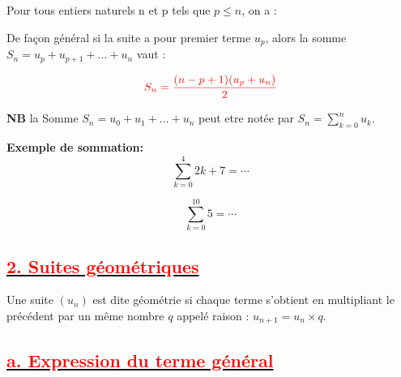 \documentclass{article}
\newcounter{exemple}
\newcommand{\exemple}{%
  \refstepcounter{exemple}%
  \textbf{\textcolor{orange}{Exemple \theexemple : }} \ignorespaces
}
\newcounter{solution}
\newcommand{\solution}{%
  \refstepcounter{solution}%
  \textbf{\textcolor{orange}{Solution \thesolution : }} \ignorespaces
}
\begin{document}
Pour tous entiers naturels n et p tels que $p \leq n$, on a :

%	
%
%

De façon général si la suite a pour premier terme $u_{p}$, alors la somme $S_{n}=u_{p}+u_{p+1}+\ldots+u_{n}$ vaut :

\begin{mdframed}[linecolor=red] %
    \[
    \color{red} S_{n}=\dfrac{(n-p+1)(u_{p}+u_{n})}{2}
    \]
\end{mdframed}

\textbf{NB} la Somme $S_{n}=u_{0}+u_{1}+\ldots+u_{n}$ peut etre notée par $S_{n}=\sum_{k=0}^{n}u_{k}$.

\textbf{Exemple de sommation:}\\

$$\sum_{k=0}^{4}2k+7 = \cdots$$

$$\sum_{k=0}^{10}5 = \cdots$$


%
%

\subsection*{\underline{\textbf{\textcolor{red}{2. Suites géométriques}}}}
Une suite $\left(u_{n}\right)$ est dite géométrie si chaque terme s'obtient en multipliant le précédent par un même nombre $q$ appelé raison : $u_{n+1}=u_{n}\times q.$
\subsection*{\underline{\textbf{\textcolor{red}{a. Expression du terme général}}}}
%
\end{document}

